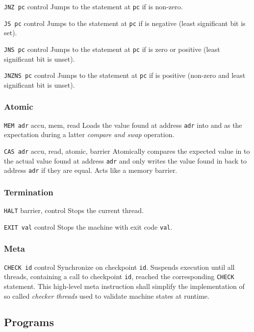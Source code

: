 {\texttt{JNZ pc}}
{control}
{Jumps to the statement at \texttt{pc} if \ACCU{} is non-zero.}

{\texttt{JS pc}}
{control}
{Jumps to the statement at \texttt{pc} if \ACCU{} is negative (least significant bit is set).}

{\texttt{JNS pc}}
{control}
{Jumps to the statement at \texttt{pc} if \ACCU{} is zero or positive (least significant bit is unset).}

{\texttt{JNZNS pc}}
{control}
{Jumps to the statement at \texttt{pc} if \ACCU{} is positive (non-zero and least significant bit is unset).}

\subsubsection{Atomic}

{\texttt{MEM adr}}
{accu, mem, read}
{Loads the value found at address \texttt{adr} into \ACCU{} and \MEM{} as the expectation during a latter \emph{compare and swap} operation.}

{\texttt{CAS adr}}
{accu, read, atomic, barrier}
{Atomically compares the expected value in \MEM{} to the actual value found at address \texttt{adr} and only writes the value found in \ACCU{} back to address \texttt{adr} if they are equal.
Acts like a memory barrier.}

\subsubsection{Termination}

{\texttt{HALT}}
{barrier, control}
{Stops the current thread.}

{\texttt{EXIT val}}
{control}
{Stops the machine with exit code \texttt{val}.}

\subsubsection{Meta}

{\texttt{CHECK id}}
{control}
{Synchronize on checkpoint \texttt{id}.
Suspends execution until all threads, containing a call to checkpoint \texttt{id}, reached the corresponding \texttt{CHECK} statement.
This high-level meta instruction shall simplify the implementation of so called \emph{checker threads} used to validate machine states at runtime.}

\subsection{Programs}

